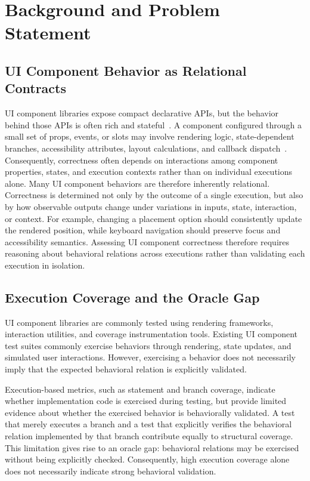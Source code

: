 \section{Background and Problem Statement}\label{sec:background}

\subsection{UI Component Behavior as Relational Contracts}\label{sec:background:components}
UI component libraries expose compact declarative APIs, but the behavior behind those APIs is often rich and stateful~\cite{jartarghar2022react, lu2025misty, liu2024enhancing}. A component configured through a small set of props, events, or slots may involve rendering logic, state-dependent branches, accessibility attributes, layout calculations, and callback dispatch~\cite{zhang2024llamatouch}. Consequently, correctness often depends on interactions among component properties, states, and execution contexts rather than on individual executions alone.
Many UI component behaviors are therefore inherently relational. Correctness is determined not only by the outcome of a single execution, but also by how observable outputs change under variations in inputs, state, interaction, or context. For example, changing a placement option should consistently update the rendered position, while keyboard navigation should preserve focus and accessibility semantics. Assessing UI component correctness therefore requires reasoning about behavioral relations across executions rather than validating each execution in isolation.

\subsection{Execution Coverage and the Oracle Gap}\label{sec:background:coverage}
UI component libraries are commonly tested using rendering frameworks, interaction utilities, and coverage instrumentation tools. 
Existing UI component test suites commonly exercise behaviors through rendering, state updates, and simulated user interactions. However, exercising a behavior does not necessarily imply that the expected behavioral relation is explicitly validated.

Execution-based metrics, such as statement and branch coverage, indicate whether implementation code is exercised during testing, but provide limited evidence about whether the exercised behavior is behaviorally validated. A test that merely executes a branch and a test that explicitly verifies the behavioral relation implemented by that branch contribute equally to structural coverage. This limitation gives rise to an oracle gap: behavioral relations may be exercised without being explicitly checked. Consequently, high execution coverage alone does not necessarily indicate strong behavioral validation.


